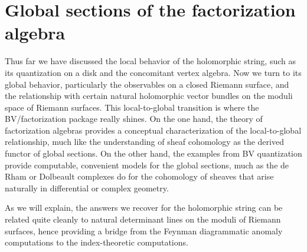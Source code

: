 \section{Global sections of the factorization algebra} 


Thus far we have discussed the local behavior of the holomorphic string,
such as its quantization on a disk and the concomitant vertex algebra.
Now we turn to its global behavior, 
particularly the observables on a closed Riemann surface,
and the relationship with certain natural holomorphic vector bundles on the moduli space of Riemann surfaces.
This local-to-global transition is where the BV/factorization package really shines.
On the one hand, the theory of factorization algebras provides a conceptual characterization of the local-to-global relationship,
much like the understanding of sheaf cohomology as the derived functor of global sections.
On the other hand, the examples from BV quantization provide computable, convenient models for the global sections,
much as the de Rham or Dolbeault complexes do for the cohomology of sheaves that arise naturally in differential or complex geometry.

As we will explain, the answers we recover for the holomorphic string can be related quite cleanly to natural determinant lines on the moduli of Riemann surfaces,
hence providing a bridge from the Feynman diagrammatic anomaly computations to the index-theoretic computations.

